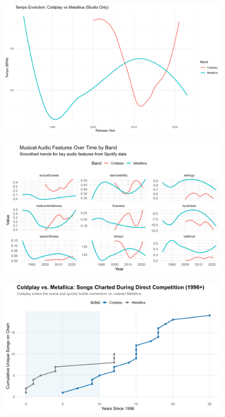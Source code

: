 \documentclass[
  man,floatsintext]{apa6}
\begin{document}
\begin{figure}

{\centering \includegraphics[width=0.9\linewidth]{../Question2/Results/audioeffects} 

}

\caption{ }\label{fig:include-image-3}
\end{figure}
\begin{figure}

{\centering \includegraphics[width=0.9\linewidth]{../Question2/Results/extraeffects} 

}

\caption{ }\label{fig:include-image-4}
\end{figure}
\begin{figure}

{\centering \includegraphics[width=0.9\linewidth]{../Question2/Results/directcompetition} 

}

\caption{ }\label{fig:include-image-5}
\end{figure}
\end{document}
